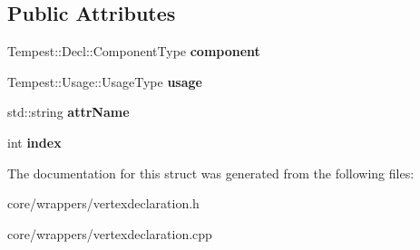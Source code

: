 \subsection*{Public Attributes}
\begin{DoxyCompactItemize}
\item 
\hypertarget{struct_tempest_1_1_vertex_declaration_1_1_declarator_1_1_element_a7cf8e30c011cb58c0e58ca654412e280}{Tempest\+::\+Decl\+::\+Component\+Type {\bfseries component}}\label{struct_tempest_1_1_vertex_declaration_1_1_declarator_1_1_element_a7cf8e30c011cb58c0e58ca654412e280}

\item 
\hypertarget{struct_tempest_1_1_vertex_declaration_1_1_declarator_1_1_element_a0e8e63eab1065973ad122e72d26595a7}{Tempest\+::\+Usage\+::\+Usage\+Type {\bfseries usage}}\label{struct_tempest_1_1_vertex_declaration_1_1_declarator_1_1_element_a0e8e63eab1065973ad122e72d26595a7}

\item 
\hypertarget{struct_tempest_1_1_vertex_declaration_1_1_declarator_1_1_element_aee44040b7595d51091796e6d19453f43}{std\+::string {\bfseries attr\+Name}}\label{struct_tempest_1_1_vertex_declaration_1_1_declarator_1_1_element_aee44040b7595d51091796e6d19453f43}

\item 
\hypertarget{struct_tempest_1_1_vertex_declaration_1_1_declarator_1_1_element_ae8fba939dcd07b40257c6636f500a802}{int {\bfseries index}}\label{struct_tempest_1_1_vertex_declaration_1_1_declarator_1_1_element_ae8fba939dcd07b40257c6636f500a802}

\end{DoxyCompactItemize}


The documentation for this struct was generated from the following files\+:\begin{DoxyCompactItemize}
\item 
core/wrappers/vertexdeclaration.\+h\item 
core/wrappers/vertexdeclaration.\+cpp\end{DoxyCompactItemize}
